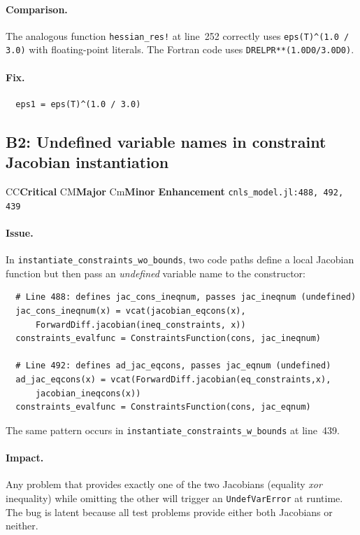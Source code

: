 \documentclass[11pt, a4paper]{article}
\newcommand{\juliaref}[2]{\texttt{#1:#2}}
\newcommand{\severity}[1]{%
  \ifx#1C\colorbox{red!20}{\textbf{Critical}}%
  \else\ifx#1M\colorbox{orange!20}{\textbf{Major}}%
  \else\ifx#1m\colorbox{yellow!20}{\textbf{Minor}}%
  \else\colorbox{blue!10}{\textbf{Enhancement}}%
  \fi\fi\fi%
}
\begin{document}
\paragraph{Comparison.}
The analogous function \texttt{hessian\_res!} at line~252 correctly uses
\texttt{eps(T)\^{}(1.0 / 3.0)} with floating-point literals.  The
Fortran code uses \texttt{DRELPR**(1.0D0/3.0D0)}.

\paragraph{Fix.}
\begin{lstlisting}
  eps1 = eps(T)^(1.0 / 3.0)
\end{lstlisting}

\subsection{B2: Undefined variable names in constraint Jacobian instantiation}
\label{sec:b2}

\severity{C} \quad \juliaref{cnls\_model.jl}{488, 492, 439}

\paragraph{Issue.}
In \texttt{instantiate\_constraints\_wo\_bounds}, two code paths define a
local Jacobian function but then pass an \emph{undefined} variable name
to the constructor:

\begin{lstlisting}
  # Line 488: defines jac_cons_ineqnum, passes jac_ineqnum (undefined)
  jac_cons_ineqnum(x) = vcat(jacobian_eqcons(x),
      ForwardDiff.jacobian(ineq_constraints, x))
  constraints_evalfunc = ConstraintsFunction(cons, jac_ineqnum)

  # Line 492: defines ad_jac_eqcons, passes jac_eqnum (undefined)
  ad_jac_eqcons(x) = vcat(ForwardDiff.jacobian(eq_constraints,x),
      jacobian_ineqcons(x))
  constraints_evalfunc = ConstraintsFunction(cons, jac_eqnum)
\end{lstlisting}

The same pattern occurs in \texttt{instantiate\_constraints\_w\_bounds}
at line~439.

\paragraph{Impact.}
Any problem that provides exactly one of the two Jacobians (equality
\emph{xor} inequality) while omitting the other will trigger an
\texttt{UndefVarError} at runtime.  The bug is latent because all test
problems provide either both Jacobians or neither.
\end{document}
